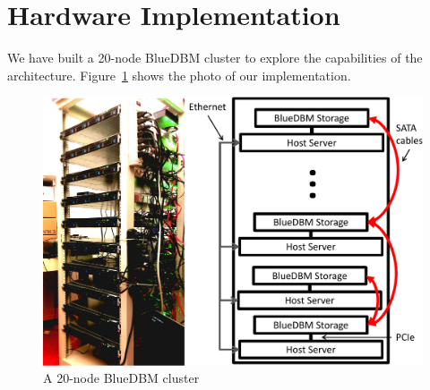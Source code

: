 \section{Hardware Implementation}
\label{sec:implementation}

We have built a 20-node BlueDBM cluster to explore the capabilities of the
architecture. Figure~\ref{fig:bluedbmcluster} shows the photo of our
implementation.

\begin{figure}[ht]
	\begin{center}
	\includegraphics[width=0.4\paperwidth]{figures/rackserver-crop.pdf}
	\caption{A 20-node BlueDBM cluster}
	\label{fig:bluedbmcluster}
	\end{center}
\end{figure}

%

